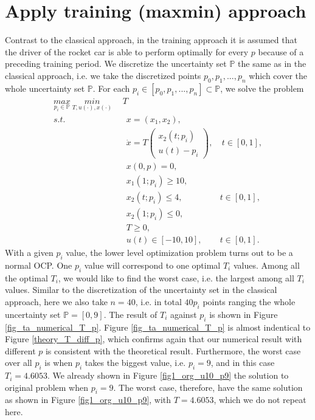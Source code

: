 \documentclass  [
  paper    = a4,
  BCOR     = 10mm,
  twoside,
  fontsize = 12pt,
  fleqn,
  toc      = bibnumbered,
  toc      = listofnumbered,
  numbers  = noendperiod,
  headings = normal,
  listof   = leveldown,
  version  = 3.03
]                                       {scrreprt}
\newcommand{\<}{\langle}
\renewcommand{\>}{\rangle}
\begin{document}
\section{Apply training (maxmin) approach}
Contrast to the classical approach, in the training approach it is assumed that the driver of the rocket car is able to perform optimally for every $p$ because of a preceding training period. We discretize the uncertainty set $\mathbb{P}$ the same as in the classical approach, i.e. we take the discretized points $p_0, p_1, ..., p_n$ which cover the whole uncertainty set $\mathbb{P}$.  For each $ p_i  \in [p_0, p_1, ..., p_n] \subset \mathbb{P}$, we solve the problem 
\begin{subequations}
	\begin{align}
		 \underset{p_i \in \mathbb{P}}{max}  \ \underset{T, u(\cdot), x(\cdot)}{min}  \ \   &   T  \\ 
		s.t.  & \ \ x = (x_1, x_2),   \label{ta_rc_x} \\ 
		& \ \  \dot{x} = T  \begin{pmatrix}  x_2(t;p_i) \\ u(t)-p_i   \end{pmatrix}, & \ t \in [0,1],  \label{ta_rc_partial} \\
		& \ \ x(0,p) = 0, \label{ta_rc_t0}\\
		& \ \ x_1(1;p_i) \geq 10, \label{ta_rc_x1_t1} \\
		& \ \ x_2(t;p_i) \leq 4, & t \in [0,1], \label{ta_rc_x2_tc} \\
		& \ \ x_2(1;p_i) \leq 0, \label{ta_rc_x2_t1}  \\
		& \ \ T \geq 0, \\
		& \ \ u(t) \in [-10, 10], & t \in [0,1]. 
	\end{align}
	\label{TA_rc}
\end{subequations}
With a given $p_i$ value, the lower level optimization problem turns out to be a normal OCP. One $p_i$ value will correspond to one optimal $T_i$ values. Among all the optimal $T_i$, we would like to find the worst case, i.e. the largest among all $T_i$ values. Similar to the discretization of the uncertainty set in the classical approach, here we also take $n=40$, i.e. in total $40 p_i$ points ranging the whole uncertainty set $\mathbb{P}=[0,9]$.  The result of $T_i$ against $p_i$ is shown in Figure \ref{fig_ta_numerical_T_p}.  Figure \ref{fig_ta_numerical_T_p} is almost indentical to Figure \ref{theory_T_diff_p}, which confirms again that our numerical result with different $p$ is consistent with the theoretical result. Furthermore, the worst case over all $p_i$ is when $p_i$ takes the biggest value, i.e. $p_i =9$, and in this case $T_i = 4.6053$.  We already shown in Figure \ref{fig1_org_u10_p9} the solution to original problem when $p_i=9$. The worst case, therefore, have the same solution as shown in Figure \ref{fig1_org_u10_p9}, with  $T=4.6053$, which we do not repeat here. 
\end{document}
